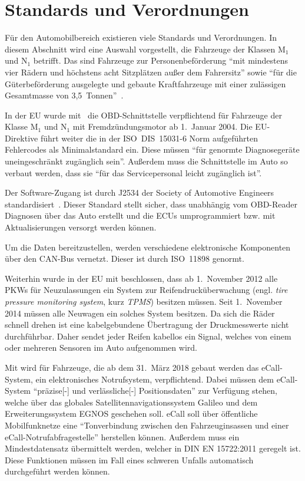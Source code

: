 \section{Standards und Verordnungen}\label{ch:standards}
Für den Automobilbereich existieren viele Standards und Verordnungen. In diesem
Abschnitt wird eine Auswahl vorgestellt, die Fahrzeuge der Klassen M$_1$ und
N$_1$ betrifft. Das sind Fahrzeuge zur Personenbeförderung
\enquote{mit mindestens vier Rädern und höchstens acht Sitzplätzen außer dem Fahrersitz}
sowie \enquote{für die Güterbeförderung ausgelegte und gebaute Kraftfahrzeuge
mit einer zulässigen Gesamtmasse von
3,5~Tonnen}~\cite{Richtlinie70/156/EWG:Fahrzeugklassen}.

In der EU wurde mit~\cite{EUDirective98/69/EC} die OBD-Schnittstelle
verpflichtend für Fahrzeuge der Klasse M$_1$ und N$_1$ mit Fremdzündungsmotor
ab 1.~Januar 2004. Die EU-Direktive führt weiter die in der ISO~DIS~15031-6
Norm aufgeführten Fehlercodes als Minimalstandard ein. Diese müssen
\enquote{für genormte Diagnosegeräte \elide uneingeschränkt zugänglich sein}.
Außerdem muss die Schnittstelle im Auto so verbaut werden, dass sie
\enquote{für das Servicepersonal leicht zugänglich \elide ist}.

Der Software-Zugang ist durch J2534 der Society of Automotive Engineers
standardisiert~\cite{SAE2004}. Dieser Standard stellt sicher, dass unabhängig
vom OBD-Reader Diagnosen über das Auto erstellt und die ECUs umprogrammiert
bzw. mit Aktualisierungen versorgt werden können.

Um die Daten bereitzustellen, werden verschiedene elektronische Komponenten
über den CAN-Bus vernetzt. Dieser ist durch ISO~11898 genormt.

Weiterhin wurde in der EU mit \cite{EURegulation661/2009} beschlossen, dass ab
1.~November 2012 alle PKWs für Neuzulassungen ein System zur
Reifen\-druck\-über\-wachung (engl. \textit{tire pressure monitoring system}, kurz
\textit{TPMS}) besitzen müssen. Seit 1.~November 2014 müssen alle Neuwagen ein
solches System besitzen. Da sich die Räder schnell drehen ist eine
kabelgebundene Übertragung der Druckmesswerte nicht durchführbar. Daher sendet
jeder Reifen kabellos ein Signal, welches von einem oder mehreren Sensoren im
Auto aufgenommen wird.

Mit \cite{EURegulation2015/ecall} wird für Fahrzeuge, die ab dem 31.~März 2018
gebaut werden das eCall-System, ein elektronisches Notrufsystem, verpflichtend.
Dabei müssen dem eCall-System \enquote{präzise\mbox{[-]} und verlässliche\mbox{[-]}
Positionsdaten} zur Verfügung stehen, welche über das globales
Satelliten\-navigations\-system Galileo und dem Erweiterungssystem EGNOS geschehen
soll. eCall soll über öffentliche Mobilfunknetze eine \enquote{Tonverbindung
zwischen den Fahrzeug\-insassen und einer eCall-Notruf\-abfrage\-stelle} herstellen
können. Außerdem muss ein Mindestdatensatz übermittelt werden, welcher in
DIN EN 15722:2011 geregelt ist. Diese Funktionen müssen im Fall eines schweren
Unfalls automatisch durchgeführt werden können.
